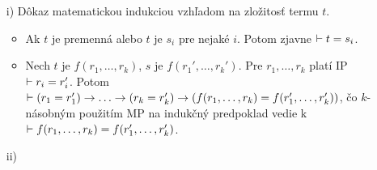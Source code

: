 \begin{dokaz}
\noindent
\begin{itemize}
    \item[i)] Dôkaz matematickou indukciou vzhľadom na zložitosť termu $t$.
        \begin{itemize}
        \item Ak $t$ je premenná alebo $t$ je $s_i$ pre nejaké $i$.
            Potom zjavne $\vdash t=s_i$.

        \item Nech $t$ je $f(r_1,\dots,r_k)$, $s$ je $f(r_1',\dots,r_k')$.
            Pre $r_1,\dots,r_k$ platí IP $\vdash r_i = r_i'$.
            Potom $\provable (r_1=r_1') \implies  \dots \implies
                (r_k = r_k') \implies (f(r_1,\dots,r_k) = f(r_1',
                    \dots, r_k'))$, čo $k$-násobným použitím MP na 
                    indukčný predpoklad vedie k
                    $\vdash f(r_1,\dots,r_k) = f(r_1', \dots,
                    r_k')$.
                
        \end{itemize}
    \item[ii)]
\end{itemize}
\end{dokaz}
